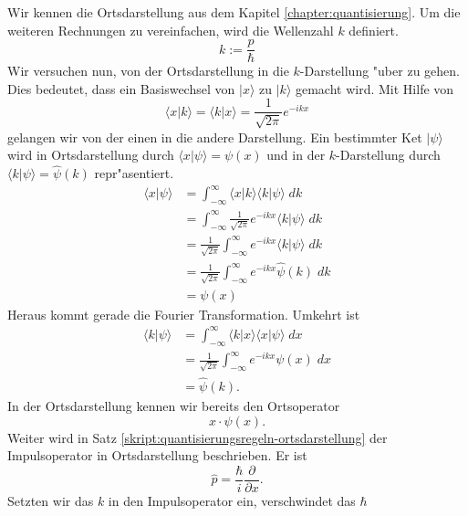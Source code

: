 \begin{refsection}
Wir kennen die Ortsdarstellung aus dem Kapitel \ref{chapter:quantisierung}.
Um die weiteren Rechnungen zu vereinfachen, wird die Wellenzahl $k$ definiert.
\begin{equation}
k := \frac{p}{\hbar}
\end{equation}
Wir versuchen nun, von der Ortsdarstellung in die $k$-Darstellung "uber zu gehen.
Dies bedeutet, dass ein Basiswechsel von $\vert x\rangle$ zu $\vert k\rangle$ gemacht wird.
Mit Hilfe von
\begin{equation}
\langle x\vert k\rangle= \langle k\vert x\rangle =\frac{1}{\sqrt{2\pi }}e^{-ikx} 
\end{equation}
gelangen wir von der einen in die andere Darstellung.
Ein bestimmter Ket $|\psi\rangle$ wird in Ortsdarstellung durch $\langle x\vert \psi\rangle = \psi(x)$ und in der $k$-Darstellung durch $\langle k\vert \psi\rangle = \hat{\psi}(k)$ repr"asentiert.
\begin{align}
\langle x\vert \psi\rangle &= \int_{-\infty}^{\infty} \langle x\vert k\rangle \langle k\vert \psi\rangle \; dk\\
&=\int_{-\infty}^{\infty} \frac{1}{\sqrt{2\pi }}e^{-ikx}  \langle k\vert \psi\rangle \; dk\\
&= \frac{1}{\sqrt{2\pi }} \int_{-\infty}^{\infty} e^{-ikx}  \langle k\vert \psi\rangle \; dk\\
&= \frac{1}{\sqrt{2\pi }} \int_{-\infty}^{\infty} e^{-ikx} \hat{\psi}(k) \; dk\\
&= \psi(x)
\end{align}
Heraus kommt gerade die Fourier Transformation.
Umkehrt ist
\begin{align}
\langle k\vert \psi\rangle &= \int_{-\infty}^{\infty} \langle k\vert x\rangle \langle x\vert \psi\rangle \; dx\\
&= \frac{1}{\sqrt{2\pi}} \int_{-\infty}^{\infty} e^{-ikx} {\psi}(x) \; dx\\
&= \hat{\psi}(k).
\end{align}
In der Ortsdarstellung kennen wir bereits den Ortsoperator
\begin{equation}
 x \cdot\psi(x).
\end{equation}
Weiter wird in Satz \ref{skript:quantisierungsregeln-ortsdarstellung} der Impulsoperator in Ortsdarstellung beschrieben. Er ist
\begin{equation}
 \hat p  =\frac{\hbar}{i}\frac{\partial}{\partial x}.
\end{equation}
Setzten wir das $k$ in den Impulsoperator ein, verschwindet das $\hbar$
\begin{equation}

\end{equation}
\end{refsection}
